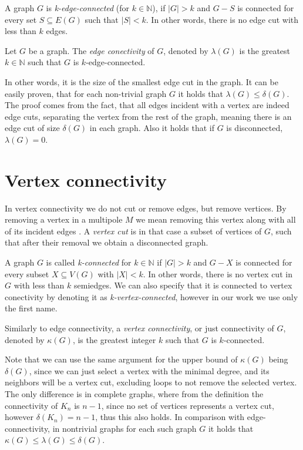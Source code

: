 \documentclass[12pt, twoside]{book}
\begin{document}
A graph $G$ is \textit{k-edge-connected} (for $k\in\mathbb{N}$), if $|G|>k$ and $G-S$ is connected for every set $S\subseteq E(G)$ such that $|S|<k$. In other words, there is no edge cut with less than $k$ edges.

\begin{definition}
	Let $G$ be a graph. The \textit{edge conectivity} of $G$, denoted by $\lambda(G)$ is the greatest $k\in\mathbb{N}$ such that $G$ is $k$-edge-connected.
\end{definition}

In other words, it is the size of the smallest edge cut in the graph. It can be easily proven, that for each non-trivial graph $G$ it holds that $\lambda(G)\leq\delta(G)$. The proof comes from the fact, that all edges incident with a vertex are indeed edge cuts, separating the vertex from the rest of the graph, meaning there is an edge cut of size $\delta(G)$ in each graph. Also it holds that if $G$ is disconnected, $\lambda(G)=0$.

\section{Vertex connectivity}

In vertex connectivity we do not cut or remove edges, but remove vertices. By removing a vertex in a multipole $M$ we mean removing this vertex along with all of its incident edges . A \textit{vertex cut} is in that case a subset of vertices of $G$, such that after their removal we obtain a disconnected graph.

A graph $G$ is called \textit{k-connected} for $k\in\mathbb{N}$ if $|G|>k$ and $G-X$ is connected for every subset $X\subseteq V(G)$ with $|X|<k$. In other words, there is no vertex cut in $G$ with less than $k$ semiedges. We can also specify that it is connected to vertex conectivity by denoting it as \textit{k-vertex-connected}, however in our work we use only the first name.

Similarly to edge connectivity, a \textit{vertex connectivity}, or just connectivity of $G$, denoted by $\kappa(G)$, is the greatest integer $k$ such that $G$ is $k$-connected.

Note that we can use the same argument for the upper bound of $\kappa(G)$ being $\delta(G)$, since we can just select a vertex with the minimal degree, and its neighbors will be a vertex cut, excluding loops to not remove the selected vertex. The only difference is in complete graphs, where from the definition the connectivity of $K_n$ is $n-1$, since no set of vertices represents a vertex cut, however $\delta(K_n)=n-1$, thus this also holds. In comparison with edge-connectivity, in nontrivial graphs for each such graph $G$ it holds that $\kappa(G)\leq \lambda(G) \leq \delta(G)$.
\end{document}
